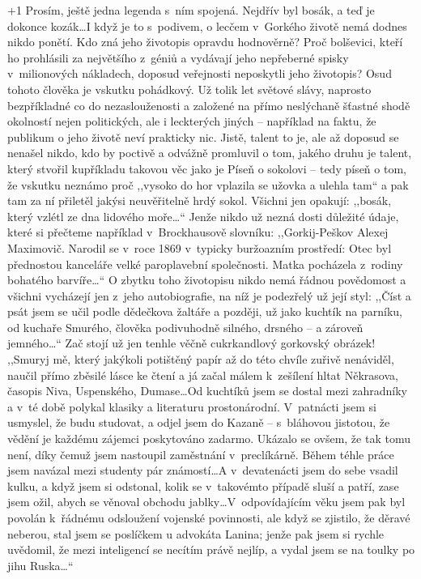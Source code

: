 \noindent
\looseness+1
Prosím, ještě jedna legenda s ním spojená. Nejdřív byl bosák, a teď je dokonce kozák\ldots I když je to s podivem, o lecčem v Gorkého životě nemá dodnes nikdo ponětí. Kdo zná jeho životopis opravdu hodnověrně? Proč bolševici, kteří ho prohlásili za největšího z géniů a vydávají jeho nepřeberné spisky v milionových nákladech, doposud veřejnosti neposkytli jeho životopis? Osud tohoto člověka je vskutku pohádkový. Už tolik let světové slávy, naprosto bezpříkladné co do nezaslouženosti a založené na přímo neslýchaně šťastné shodě okolností nejen politických, ale i leckterých jiných -- například na faktu, že publikum o jeho životě neví prakticky nic. Jistě, talent to je, ale až doposud se nenašel nikdo, kdo by poctivě a odvážně promluvil o tom, jakého druhu je talent, který stvořil kupříkladu takovou věc jako je Píseň o sokolovi -- tedy píseň o tom, že vskutku neznámo proč ,,vysoko do hor vplazila se užovka a ulehla tam`` a pak tam za ní přiletěl jakýsi neuvěřitelně hrdý sokol. Všichni jen opakují: ,,bosák, který vzlétl ze dna lidového moře\ldots`` Jenže nikdo už nezná dosti důležité údaje, které si přečteme například v Brockhausově slovníku: ,,Gorkij-Peškov Alexej Maximovič. Narodil se v roce 1869 v typicky buržoazním prostředí: Otec byl přednostou kanceláře velké paroplavební společnosti. Matka pocházela z rodiny bohatého barvíře\ldots`` O zbytku toho životopisu nikdo nemá řádnou povědomost a všichni vycházejí jen z jeho autobiografie, na níž je podezřelý už její styl: ,,Číst a psát jsem se učil podle dědečkova žaltáře a později, už jako kuchtík na parníku, od kuchaře Smurého, člověka podivuhodně silného, drsného -- a zároveň jemného\ldots`` Zač stojí už jen tenhle věčně cukrkandlový gorkovský obrázek! ,,Smuryj mě, který jakýkoli potištěný papír až do této chvíle zuřivě nenáviděl, naučil přímo zběsilé lásce ke čtení a já začal málem k zešílení hltat Někrasova, časopis Niva, Uspenského, Dumase\ldots Od kuchtíků jsem se dostal mezi zahradníky a v té době polykal klasiky a literaturu prostonárodní. V patnácti jsem si usmyslel, že budu studovat, a odjel jsem do Kazaně -- s bláhovou jistotou, že vědění je každému zájemci poskytováno zadarmo. Ukázalo se ovšem, že tak tomu není, díky čemuž jsem nastoupil zaměstnání v preclíkárně. Během téhle práce jsem  navázal mezi studenty pár známostí\ldots A v devatenácti jsem do sebe vsadil kulku, a když jsem si odstonal, kolik se v takovémto případě sluší a patří, zase jsem ožil, abych se věnoval obchodu jablky\ldots V odpovídajícím věku jsem pak byl povolán k řádnému odsloužení vojenské povinnosti, ale když se zjistilo, že děravé neberou, stal jsem se poslíčkem u advokáta Lanina; jenže pak jsem si rychle uvědomil, že mezi inteligencí se necítím právě nejlíp, a vydal jsem se na toulky po jihu Ruska\ldots``

